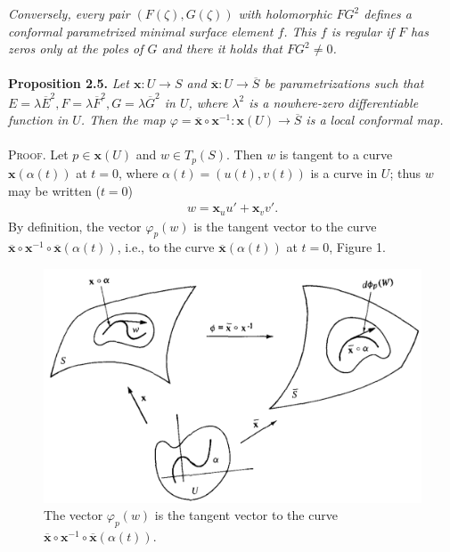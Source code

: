 \documentclass[a4paper]{article}
\numberwithin{equation}{section}
\begin{document}
\textit{Conversely, every pair $\left(F\left(\zeta
\right),G\left(\zeta \right)\right)$ with holomorphic $FG^2$ defines a conformal parametrized minimal surface element $f$. This $f$ is regular if $F$ has zeros only at the poles of $G$ and there it holds that $FG^2\ne 0$.}\\
\\
\textbf{Proposition 2.5.} \textit{Let $\mathbf{x}:U\to S$ and $\overline{\mathbf{x}}:U\to \overline{S}$ be parametrizations such that $E = \lambda {\overline E ^2},F = \lambda {\overline F ^2},G = \lambda {\overline G ^2}$ in $U$, where $\lambda^2$ is a nowhere-zero differentiable function in $U$. Then the map $\varphi  = \overline{\mathbf{x}}  \circ {\mathbf{x}^{ - 1}}:\mathbf{x}\left( U \right) \to \overline S $ is a local conformal map.}\\
\\
\textsc{Proof.} Let $p\in \mathbf{x}\left(U\right)$ and $w\in T_p\left(S\right)$. Then $w$ is tangent to a curve $\mathbf{x}\left(\alpha\left(t\right)\right)$ at $t=0$, where $\alpha\left(t\right) =\left(u\left(t\right),v\left(t\right)\right)$ is a curve in $U$; thus $w$ may be written ($t=0$)
\begin{align}
w = {\mathbf{x}_u}u' + {\mathbf{x}_v}v'.
\end{align}
By definition, the vector $\varphi _p\left(w\right)$ is the tangent vector to the curve $\overline{ \mathbf{x}}  \circ {\mathbf{x}^{ - 1}} \circ \overline{\mathbf{x}} \left( {\alpha \left( t \right)} \right)$, i.e., to the curve $\overline{\mathbf{x}}\left(\alpha \left(t\right)\right)$ at $t=0$, Figure 1.
\begin{figure}[H]
\includegraphics[scale=0.4]{3}
\caption{The vector $\varphi _p\left(w\right)$ is the tangent vector to the curve $\overline{ \mathbf{x}}  \circ {\mathbf{x}^{ - 1}} \circ \overline{\mathbf{x}} \left( {\alpha \left( t \right)} \right)$.}
\end{figure}
\end{document}
